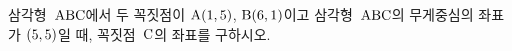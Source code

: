 삼각형~$\mathrm{ABC}$에서 두 꼭짓점이 $\mathrm{A}(1{,}\mkern3mu\mathopen{}5)$, $\mathrm{B}(6{,}\mkern3mu\mathopen{}1)$이고 삼각형~$\mathrm{ABC}$의 무게중심의 좌표가 $(5{,}\mkern3mu\mathopen{}5)$일 때, 꼭짓점~$\mathrm{C}$의 좌표를 구하시오.
